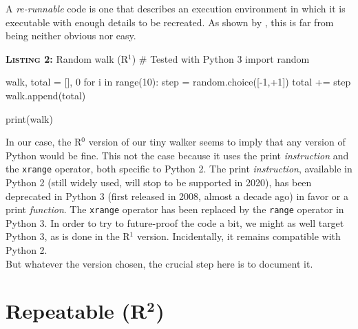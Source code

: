 \documentclass[a4paper,11pt]{article}
\begin{document}
A \emph{re-runnable} code is one that describes an execution environment in which it is executable with enough details to be recreated.
As shown by \citep{Collberg:2016}, this is far from being neither obvious nor easy.

% 
% 
%
\begin{code}{\textbf{\textsc{Listing 2:}} Random walk (R$^1$)}
# Tested with Python 3
import random

walk, total = [], 0
for i in range(10):
    step = random.choice([-1,+1])     
    total += step
    walk.append(total)
    
print(walk)
\end{code}

In our case, the R$^0$ version of our tiny walker seems to imply
that any version of Python would be fine.
This not the case because it uses the print {\em instruction} and the {\tt xrange} operator, both specific to Python 2.
The print {\em instruction}, available in Python 2 (still widely used, will stop to be supported in 2020), 
has been deprecated in Python 3 (first released in 2008, almost a decade ago)
in favor or a  print {\em function}.
The {\tt xrange} operator has been replaced by the {\tt range} operator in Python 3.
In order to try to future-proof the code a bit, we might as well target Python 3, as is done in the R$^1$ version.
Incidentally, it remains compatible with Python 2.\\

But whatever the version chosen,
the crucial step here is to document it.


\section*{Repeatable (R$^{\mathbf 2}$)}

% 
% 
% 
\end{document}

